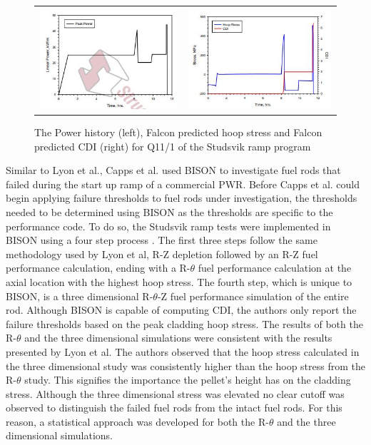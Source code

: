 \documentclass[edeposit,fullpage,11pt]{uiucthesis2009}
\begin{document}
\begin{figure}
\begin{tabular}{cc}
\includegraphics[width=0.5\linewidth]{./Figures/lyon_image_6.JPG} & \includegraphics[width=0.5\linewidth]{./Figures/lyon_image_7.JPG}
\end{tabular}
\caption{The Power history (left), Falcon predicted hoop stress and Falcon predicted CDI (right) for Q11/1 of the Studsvik ramp program \cite{lyon_pci_2009}}
\label{fig:paper_3_res}
\end{figure}


Similar to Lyon et al., Capps et al. \cite{capps_pci_2017} used BISON to investigate fuel rods that failed during the start up ramp of a commercial \gls{PWR}.
Before Capps et al. could begin applying failure thresholds to fuel rods under investigation, the thresholds needed to be determined using BISON as the thresholds are specific to the performance code.
To do so, the Studsvik ramp tests were implemented in BISON using a four step process \cite{killeen_experimental_2004}.
The first three steps follow the same methodology used by Lyon et al, R-Z depletion followed by an R-Z fuel performance calculation, ending with a R-$\theta$ fuel performance calculation at the axial location with the highest hoop stress.
The fourth step, which is unique to BISON, is a three dimensional R-$\theta$-Z fuel performance simulation of the entire rod. %
Although BISON is capable of computing \gls{CDI}, the authors only report the failure thresholds based on the peak cladding hoop stress.
The results of both the R-$\theta$ and the three dimensional simulations were consistent with the results presented by Lyon et al.
The authors observed that the hoop stress calculated in the three dimensional study was consistently higher than the hoop stress from the R-$\theta$ study.
This signifies the importance the pellet's height has on the cladding stress.
Although the three dimensional stress was elevated no clear cutoff was observed to distinguish the failed fuel rods from the intact fuel rods.
For this reason, a statistical approach was developed for both the R-$\theta$ and the three dimensional simulations.
\end{document}
